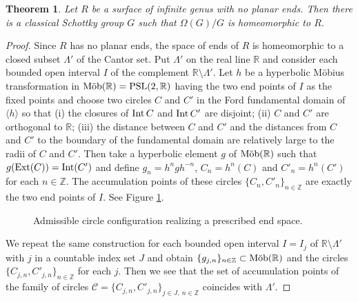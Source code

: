 \documentclass[12pt]{amsart}
\theoremstyle{plain}
\newtheorem{thm}{Theorem}[section]
\DeclareMathOperator{\Mob}{\mbox{\rm{M\"ob}}}
\begin{document}
\begin{thm} \label{thm: classical schottky uniformize}
Let $R$ be a  surface of infinite genus with no planar ends. Then there is a classical
Schottky group $G$ such that $\Omega(G)/G$ is homeomorphic to $R$.
\end{thm}

\begin{proof}
Since $R$ has no planar ends, the space of ends of $R$ is homeomorphic to
a closed subset $\Lambda'$ of the Cantor set. Put $\Lambda'$ on the real line $\mathbb R$ and
consider each bounded open interval $I$ of the complement $\mathbb R \setminus \Lambda'$.
Let $h$ be a hyperbolic M\"obius transformation in $\Mob(\mathbb R)={\rm PSL}(2,\mathbb R)$ 
having the two end points of $I$
as the fixed points and choose two circles $C$ and $C'$ in the Ford fundamental domain of $\langle h \rangle$ 
so that
(i) the closures of ${\rm Int}\,C$ and ${\rm Int}\,C'$ are disjoint; (ii) $C$ and $C'$ are orthogonal to
$\mathbb R$; (iii) the distance between $C$ and $C'$ and the distances from $C$ and $C'$ to the boundary of the
fundamental domain are relatively large to the radii of $C$ and $C'$.
Then take a hyperbolic element $g$ of $\Mob(\mathbb R)$ such that
$g({\rm Ext}(C))={\rm Int}(C')$ and define $g_n=h^n g h^{-n}$, $C_n=h^n(C)$ and $C'_n=h^n(C')$ 
for each $n \in \mathbb Z$. The accumulation points of these circles $\{C_n,C'_n\}_{n \in \mathbb Z}$
are exactly the two end points of $I$. See Figure \ref{fig: EndSpace}.

\begin{figure}[h]
\begin{center}
\vspace{-5cm}
\end{center}
\caption{Admissible circle configuration realizing a prescribed end space.} \label{fig: EndSpace}

\end{figure}


We repeat the same construction for each bounded open interval $I=I_j$ of $\mathbb R \setminus \Lambda'$ 
with $j$ in a countable index set $J$
and obtain
$\{g_{j,n}\}_{n \in \mathbb Z} \subset \Mob(\mathbb R)$ and 
the circles $\{C_{j,n},C'_{j,n}\}_{n \in \mathbb Z}$ for each $j$.
Then we see that the set of accumulation points of the family of circles 
$\mathcal C=\{C_{j,n},C'_{j,n}\}_{j \in J,\ n \in \mathbb Z}$ coincides with $\Lambda'$.



\end{proof}
\end{document}
